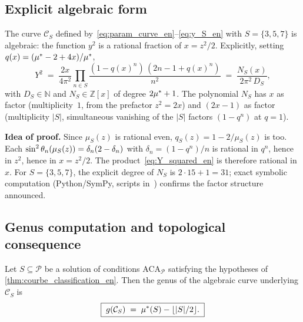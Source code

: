 \subsection{Explicit algebraic form}
\label{sec:courbe:forme}

\begin{theoreme}
\label{thm:algebraicite_PT_en}
The curve $\mathcal C_S$ defined by~\eqref{eq:param_curve_en}--\eqref{eq:y_S_en} with $S = \{3, 5, 7\}$ is algebraic: the function $y^{2}$ is a rational fraction of $x = z^{2}/2$. Explicitly, setting $q(x) = (\mu^{*} - 2 + 4x)/\mu^{*}$,
\begin{equation}
Y^{2} \;=\; \dfrac{2x}{4\pi^{2}} \prod_{n \in S} \dfrac{(1 - q(x)^{n})\,(2n - 1 + q(x)^{n})}{n^{2}} \;=\; \dfrac{N_S(x)}{2\pi^{2}\,D_S},
\label{eq:Y_squared_en}
\end{equation}
with $D_S \in \mathbb N$ and $N_S \in \mathbb Z[x]$ of degree $2 \mu^{*} + 1$. The polynomial $N_S$ has $x$ as factor (multiplicity~$1$, from the prefactor $z^{2} = 2x$) and $(2x - 1)$ as factor (multiplicity $|S|$, simultaneous vanishing of the $|S|$ factors $(1 - q^{n})$ at $q = 1$).
\end{theoreme}

\textbf{Idea of proof.} Since $\mu_S(z)$ is rational even, $q_S(z) = 1 - 2/\mu_S(z)$ is too. Each $\sin^{2}\theta_{n}(\mu_S(z)) = \delta_n(2 - \delta_n)$ with $\delta_n = (1 - q^{n})/n$ is rational in $q^{n}$, hence in $z^{2}$, hence in $x = z^{2}/2$. The product~\eqref{eq:Y_squared_en} is therefore rational in $x$. For $S = \{3, 5, 7\}$, the explicit degree of $N_S$ is $2 \cdot 15 + 1 = 31$; exact symbolic computation (Python/SymPy, scripts in~\cite{PT_GeoFlow_PersistenceCurve}) confirms the factor structure announced.

\subsection{Genus computation and topological consequence}
\label{sec:courbe:genre}

\begin{theoreme}
\label{thm:genre_en}
Let $S \subseteq \mathcal P$ be a solution of conditions ACA$_{\mathcal P}$ satisfying the hypotheses of \ref{thm:courbe_classification_en}. Then the genus of the algebraic curve underlying $\mathcal C_S$ is
\[
\boxed{\;g(\mathcal C_S) \;=\; \mu^{*}(S) - \lfloor |S|/2 \rfloor.\;}
\]
\end{theoreme}

